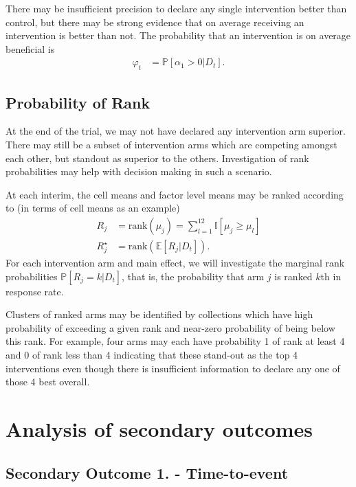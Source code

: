 \documentclass[
  bibliography=totoc]{scrreprt}
\begin{document}
There may be insufficient precision to declare any single intervention better than control, but there may be strong evidence that on average receiving an intervention is better than not.
The probability that an intervention is on average beneficial is
\[
\begin{aligned}
\varphi_t &= \mathbb P[\alpha_1 > 0 | D_t].
\end{aligned}
\]

\hypertarget{probability-of-rank}{%
\subsection{Probability of Rank}\label{probability-of-rank}}

At the end of the trial, we may not have declared any intervention arm superior.
There may still be a subset of intervention arms which are competing amongst each other, but standout as superior to the others.
Investigation of rank probabilities may help with decision making in such a scenario.

At each interim, the cell means and factor level means may be ranked according to (in terms of cell means as an example)
\[
\begin{aligned}
R_j &= \text{rank}(\mu_j) = \sum_{l=1}^{12} \mathbb I[\mu_j\geq\mu_l] \\
R_j^\star &=\text{rank}\left(\mathbb E[R_j|D_t]\right).
\end{aligned}
\]
For each intervention arm and main effect, we will investigate the marginal rank probabilities \(\mathbb P[R_j=k|D_t]\), that is, the probability that arm \(j\) is ranked \(k\)th in response rate.

Clusters of ranked arms may be identified by collections which have high probability of exceeding a given rank and near-zero probability of being below this rank.
For example, four arms may each have probability 1 of rank at least 4 and 0 of rank less than 4 indicating that these stand-out as the top 4 interventions even though there is insufficient information to declare any one of those 4 best overall.

\hypertarget{analysis-of-secondary-outcomes}{%
\section{Analysis of secondary outcomes}\label{analysis-of-secondary-outcomes}}

\hypertarget{secondary-outcome-1.---time-to-event}{%
\subsection{Secondary Outcome 1. - Time-to-event}\label{secondary-outcome-1.---time-to-event}}
\end{document}
